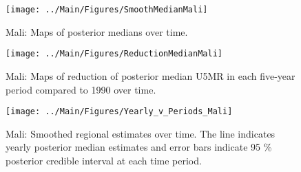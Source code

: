\documentclass[12pt]{article}\usepackage[]{graphicx}\usepackage[]{color}
\newenvironment{knitrout}{}{} %
\begin{document}
\begin{knitrout}
\color{fgcolor}\begin{figure}[bht]

{\centering \texttt{[image: ../Main/Figures/SmoothMedianMali]} 

}

\caption[Mali]{Mali: Maps of posterior medians over time.}\label{fig:unnamed-chunk-214}
\end{figure}


\end{knitrout}
\begin{knitrout}
\color{fgcolor}\begin{figure}[bht]

{\centering \texttt{[image: ../Main/Figures/ReductionMedianMali]} 

}

\caption[Mali]{Mali: Maps of reduction of posterior median U5MR in each five-year period compared to 1990 over time.}\label{fig:unnamed-chunk-215}
\end{figure}


\end{knitrout}
\begin{knitrout}
\color{fgcolor}\begin{figure}[bht]

{\centering \texttt{[image: ../Main/Figures/Yearly\_v\_Periods\_Mali]} 

}

\caption[Mali]{Mali: Smoothed regional estimates over time. The line indicates yearly posterior median estimates and error bars indicate 95 \% posterior credible interval at each time period.}\label{fig:unnamed-chunk-216}
\end{figure}


\end{knitrout}
\end{document}
